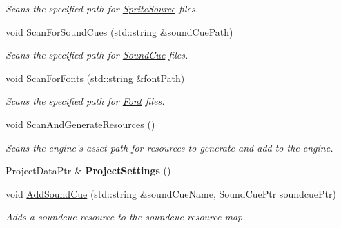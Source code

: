 \begin{DoxyCompactItemize}
\begin{DoxyCompactList}\small\item\em Scans the specified path for \hyperlink{classDCEngine_1_1SpriteSource}{Sprite\-Source} files. \end{DoxyCompactList}\item 
\hypertarget{classDCEngine_1_1Systems_1_1Content_a0a335e453e8e726d9f95be70ffb824b7}{void \hyperlink{classDCEngine_1_1Systems_1_1Content_a0a335e453e8e726d9f95be70ffb824b7}{Scan\-For\-Sound\-Cues} (std\-::string \&sound\-Cue\-Path)}\label{classDCEngine_1_1Systems_1_1Content_a0a335e453e8e726d9f95be70ffb824b7}

\begin{DoxyCompactList}\small\item\em Scans the specified path for \hyperlink{classDCEngine_1_1SoundCue}{Sound\-Cue} files. \end{DoxyCompactList}\item 
\hypertarget{classDCEngine_1_1Systems_1_1Content_a2900eb911301c2bfff4ed2ed6bebeb85}{void \hyperlink{classDCEngine_1_1Systems_1_1Content_a2900eb911301c2bfff4ed2ed6bebeb85}{Scan\-For\-Fonts} (std\-::string \&font\-Path)}\label{classDCEngine_1_1Systems_1_1Content_a2900eb911301c2bfff4ed2ed6bebeb85}

\begin{DoxyCompactList}\small\item\em Scans the specified path for \hyperlink{classDCEngine_1_1Font}{Font} files. \end{DoxyCompactList}\item 
void \hyperlink{classDCEngine_1_1Systems_1_1Content_a12d79aa3afbd0ee1d48bcc885de355b7}{Scan\-And\-Generate\-Resources} ()
\begin{DoxyCompactList}\small\item\em Scans the engine's asset path for resources to generate and add to the engine. \end{DoxyCompactList}\item 
\hypertarget{classDCEngine_1_1Systems_1_1Content_aec249a2278c6b8f04e8e80579dbc4848}{Project\-Data\-Ptr \& {\bfseries Project\-Settings} ()}\label{classDCEngine_1_1Systems_1_1Content_aec249a2278c6b8f04e8e80579dbc4848}

\item 
void \hyperlink{classDCEngine_1_1Systems_1_1Content_ac6c5048b17bdb09a4ffa660d88b90048}{Add\-Sound\-Cue} (std\-::string \&sound\-Cue\-Name, Sound\-Cue\-Ptr soundcue\-Ptr)
\begin{DoxyCompactList}\small\item\em Adds a soundcue resource to the soundcue resource map. \end{DoxyCompactList}\end{DoxyCompactItemize}
